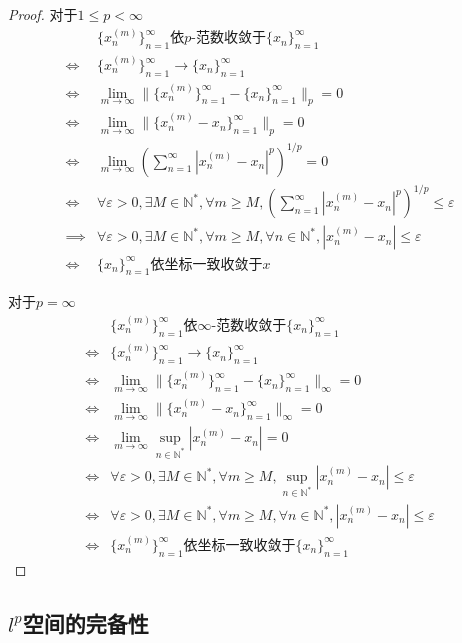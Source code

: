 \documentclass[lang = cn, scheme = chinese, thmcnt = section]{elegantbook}
\newcommand{\N}{\mathbb{N}}            %
\begin{document}
\begin{proof}
	对于$1\le p<\infty$
	\begin{align*}
		& \{ x_n^{(m)} \}_{n=1}^{\infty}\text{依}p\text{-范数}\text{收敛于}\{x_n\}_{n=1}^{\infty}\\
		\iff & \{ x_n^{(m)} \}_{n=1}^{\infty}\longrightarrow \{x_n\}_{n=1}^{\infty}\\
		\iff & \lim_{m\to\infty}\| \{ x_n^{(m)}\}_{n=1}^{\infty}-\{x_n \}_{n=1}^{\infty} \|_p=0\\
		\iff & \lim_{m\to\infty}\| \{ x_n^{(m)}-x_n \}_{n=1}^{\infty} \|_p=0\\
		\iff & \lim_{m\to\infty}\left( \sum_{n=1}^{\infty}|x_n^{(m)}-x_n|^p \right)^{1/p}=0\\
		\iff & \forall \varepsilon>0,\exists M\in\N^*,\forall m\ge M,\left( \sum_{n=1}^{\infty}|x_n^{(m)}-x_n|^p \right)^{1/p}\le \varepsilon\\
		\implies & \forall \varepsilon>0,\exists M\in\N^*,\forall m\ge M,\forall n\in\N^*,|x_n^{(m)}-x_n|\le\varepsilon\\
		\iff & \{x_n\}_{n=1}^{\infty}\text{依坐标一致收敛于}x
	\end{align*}
	
	对于$p=\infty$
	\begin{align*}
		& \{ x_n^{(m)} \}_{n=1}^{\infty}\text{依}\infty\text{-范数}\text{收敛于}\{x_n\}_{n=1}^{\infty}\\
		\iff & \{ x_n^{(m)} \}_{n=1}^{\infty}\longrightarrow \{x_n\}_{n=1}^{\infty}\\
		\iff & \lim_{m\to\infty}\| \{ x_n^{(m)}\}_{n=1}^{\infty}-\{x_n \}_{n=1}^{\infty} \|_\infty=0\\
		\iff & \lim_{m\to\infty}\| \{ x_n^{(m)}-x_n \}_{n=1}^{\infty} \|_\infty
		=0\\
		\iff & \lim_{m\to\infty}\sup_{n\in\N^*}|x_n^{(m)}-x_n|=0\\
		\iff & \forall\varepsilon>0,\exists M\in\N^*,\forall m\ge M,\sup_{n\in\N^*}|x_n^{(m)}-x_n|\le\varepsilon\\
		\iff & \forall\varepsilon>0,\exists M\in\N^*,\forall m\ge M,\forall n\in\N^*,|x_n^{(m)}-x_n|\le\varepsilon\\
		\iff & \{ x_n^{(m)} \}_{n=1}^{\infty}\text{依坐标一致收敛于}\{x_n\}_{n=1}^{\infty}
	\end{align*}
\end{proof}

\subsection{$l^p$空间的完备性}
\end{document}
